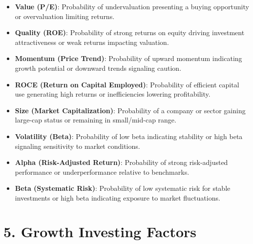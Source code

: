 \documentclass[
]{book}
\providecommand{\tightlist}{%
  \setlength{\itemsep}{0pt}\setlength{\parskip}{0pt}}
\begin{document}
\begin{itemize}
\tightlist
\item
  \textbf{Value (P/E)}: Probability of undervaluation presenting a buying opportunity or overvaluation limiting returns.\\
\item
  \textbf{Quality (ROE)}: Probability of strong returns on equity driving investment attractiveness or weak returns impacting valuation.\\
\item
  \textbf{Momentum (Price Trend)}: Probability of upward momentum indicating growth potential or downward trends signaling caution.\\
\item
  \textbf{ROCE (Return on Capital Employed)}: Probability of efficient capital use generating high returns or inefficiencies lowering profitability.\\
\item
  \textbf{Size (Market Capitalization)}: Probability of a company or sector gaining large-cap status or remaining in small/mid-cap range.\\
\item
  \textbf{Volatility (Beta)}: Probability of low beta indicating stability or high beta signaling sensitivity to market conditions.\\
\item
  \textbf{Alpha (Risk-Adjusted Return)}: Probability of strong risk-adjusted performance or underperformance relative to benchmarks.\\
\item
  \textbf{Beta (Systematic Risk)}: Probability of low systematic risk for stable investments or high beta indicating exposure to market fluctuations.
\end{itemize}

\section{5. Growth Investing Factors}\label{growth-investing-factors}
\end{document}

